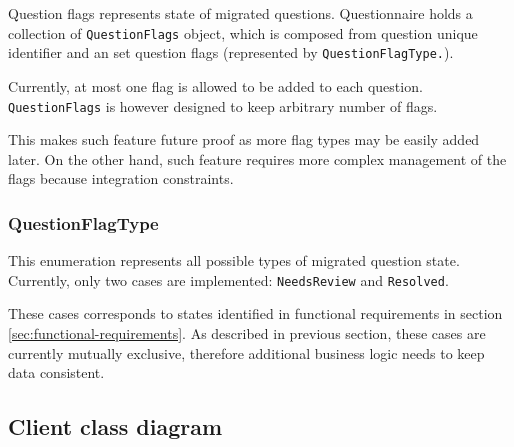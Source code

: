 Question flags represents state of migrated questions.
Questionnaire holds a collection of \texttt{QuestionFlags} object, which is composed from question unique identifier and an set question flags (represented by \texttt{QuestionFlagType.}).

Currently, at most one flag is allowed to be added to each question.
\texttt{QuestionFlags} is however designed to keep arbitrary number of flags.

This makes such feature future proof as more flag types may be easily added later.
On the other hand, such feature requires more complex management of the flags because integration constraints.

\subsubsection*{QuestionFlagType}

This enumeration represents all possible types of migrated question state.
Currently, only two cases are implemented: \texttt{NeedsReview} and \texttt{Resolved}.

These cases corresponds to states identified in functional requirements in section \ref{sec:functional-requirements}.
As described in previous section, these cases are currently mutually exclusive, therefore additional business logic needs to keep data consistent.

\subsection{Client class diagram}

